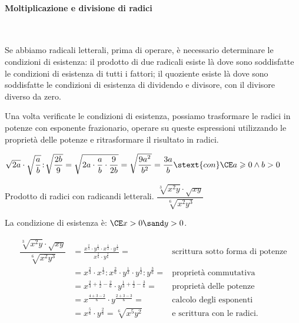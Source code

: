 \paragraph{Moltiplicazione e divisione di radici}~

Se abbiamo radicali letterali, prima di operare, è necessario determinare 
le condizioni di esistenza: il prodotto di due radicali esiste là dove sono 
soddisfatte le condizioni di esistenza di tutti i fattori; 
il quoziente esiste là dove sono soddisfatte le condizioni di esistenza di 
dividendo e divisore, con il divisore diverso da zero.

Una volta verificate le condizioni di esistenza, possiamo trasformare le
radici in potenze con esponente frazionario, operare su queste espressioni 
utilizzando le proprietà delle potenze e ritrasformare il risultato in 
radici.

\begin{esempio}{}{}

\(\sqrt{2a}\cdot \sqrt{\dfrac a b}\!:\!\sqrt{\dfrac {2b} 9}=
  \sqrt{2a\cdot \dfrac a b\cdot \dfrac 9{2b}}=\sqrt{\dfrac{9a^2}{b^2}}=
  \dfrac {3a} b \stext{con} 
  \CE a \geqslant 0 \wedge b > 0\)
\end{esempio}

\begin{esempio}{}{}
Prodotto di radici con radicandi letterali.
\(\dfrac{\sqrt[3]{x^2y}\cdot \sqrt{xy}}{\sqrt[6]{x^2y^3}}\)

La condizione di esistenza è: \(\CE x > 0 \sand y > 0\).

\begin{align*}
\dfrac{\sqrt[3]{x^2y}\cdot \sqrt{xy}}{\sqrt[6]{x^2y^3}} &=
\frac{{x^\frac{2}{3} \cdot y^\frac{1}{3}} \cdot 
      x^\frac{1}{2} \cdot y^\frac{1}{2}}
    {x^\frac{2}{6} \cdot y^\frac{3}{6}} =
        & \mbox{scrittura sotto forma di potenze}\\
  &=x^\frac{2}{3} \cdot x^\frac{1}{2} : x^\frac{2}{6} \cdot 
    y^\frac{1}{3} \cdot y^\frac{1}{2} : y^\frac{3}{6}=
        & \mbox{proprietà commutativa} \\
  &=x^{\frac{2}{3} + \frac{1}{2} - \frac{2}{6}} \cdot 
    y^{\frac{1}{3} + \frac{1}{2} - \frac{3}{6}}= 
        & \mbox{proprietà delle potenze}\\
  &=x^{\frac{4+3-2}{6}} \cdot y^{\frac{2+3-3}{6}}=
        & \mbox{calcolo degli esponenti} \\
  &=x^{\frac{5}{6}} \cdot y^{\frac{2}{6}}=
  \sqrt[6]{x^5y^2}
        & \mbox{e scrittura con le radici.} 
\end{align*}

\end{esempio}

